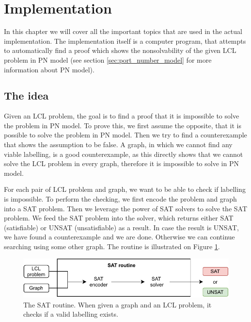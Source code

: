 
\section{Implementation} \label{sec:implementation}
In this chapter we will cover all the important topics that are used in the actual implementation.
The implementation itself is a computer program, that attempts to automatically find a proof which shows the nonsolvability of the given LCL problem in PN model (see section \ref{sec:port_number_model} for more information about PN model).

\subsection{The idea}
Given an LCL problem, the goal is to find a proof that it is impossible to solve the problem in PN model.
To prove this, we first assume the opposite, that it is possible to solve the problem in PN model.
Then we try to find a counterexample that shows the assumption to be false.
A graph, in which we cannot find any viable labelling, is a good counterexample, as this directly shows that we cannot solve the LCL problem in every graph, therefore it is impossible to solve in PN model.

For each pair of LCL problem and graph, we want to be able to check if labelling is impossible.
To perform the checking, we first encode the problem and graph into a SAT problem.
Then we leverage the power of SAT solvers to solve the SAT problem.
We feed the SAT problem into the solver, which returns either SAT (satisfiable) or UNSAT (unsatisfiable) as a result.
In case the result is UNSAT, we have found a counterexample and we are done.
Otherwise we can continue searching using some other graph.
The routine is illustrated on Figure \ref{fig:implementatio:idea:1}.

\begin{figure}[h]
\centering
\includegraphics[]{diagrams/implementation_idea_diagram2.pdf}
\caption{The SAT routine. When given a graph and an LCL problem, it checks if a valid labelling exists.}
\label{fig:implementatio:idea:1}
\end{figure}

